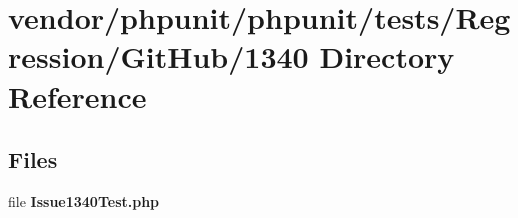 \section{vendor/phpunit/phpunit/tests/\+Regression/\+Git\+Hub/1340 Directory Reference}
\label{dir_b8ff9b0c9c95c6577fb8da0b183df3b3}
\subsection*{Files}
\begin{DoxyCompactItemize}
\item 
file {\bf Issue1340\+Test.\+php}
\end{DoxyCompactItemize}
